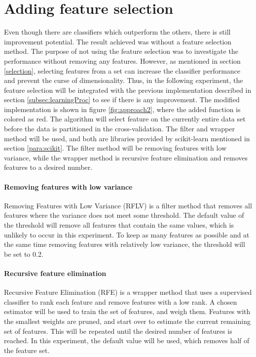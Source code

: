 \documentclass[USenglish]{ifimaster}  %
\begin{document}
\FloatBarrier

	
	
	
\section{Adding feature selection}
Even though there are classifiers which outperform the others, there is still improvement potential. The result achieved was without a feature selection method. The purpose of not using the feature selection was to investigate the performance without removing any features. However, as mentioned in section \ref{selection}, selecting features from a set can increase the classifier performance and prevent the curse of dimensionality. Thus, in the following experiment, the feature selection will be integrated with the previous implementation described in section \ref{subsec:learningProc} to see if there is any improvement. The modified implementation is shown in figure \ref{fig:approach2}, where the added function is colored as red. The algorithm will select feature on the currently entire data set before the data is partitioned in the cross-validation. The filter and wrapper method will be used, and both are libraries provided by scikit-learn mentioned in section \ref{para:scikit}. The filter method will be removing features with low variance, while the wrapper method is recursive feature elimination and removes features to a desired number. 

\paragraph{Removing features with low variance} \label{ap:variance}
Removing Features with Low Variance (RFLV) is a filter method that removes all features where the variance does not meet some threshold. The default value of the threshold will remove all features that contain the same values, which is unlikely to occur in this experiment. To keep as many features as possible and at the same time removing features with relatively low variance, the threshold will be set to 0.2.

\paragraph{Recursive feature elimination} \label{ap:rfe}
Recursive Feature Elimination (RFE) is a wrapper method that uses a supervised classifier to rank each feature and remove features with a low rank. A chosen estimator will be used to train the set of features, and weigh them. Features with the smallest weights are pruned, and start over to estimate the current remaining set of features. This will be repeated until the desired number of features is reached. In this experiment, the default value will be used, which removes half of the feature set.
\end{document}
